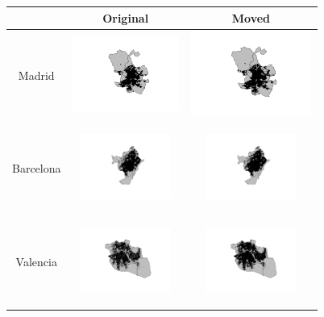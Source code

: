 \documentclass[times,final]{elsarticle}
\begin{document}
\begin{figure}
\centering
\begin{tabular}{|c|c|c|}
\hline
& Original & Moved
\\
\hline
Madrid &
\includegraphics[width=3.5cm, height=2.8cm]{figures/points-post-madrid}
&
\includegraphics[width=4cm, height=2.8cm]{figures/points-post-madrid}
\\
Barcelona &
\includegraphics[width=3cm, height=2.8cm]{figures/points-pre-barcelona}
&
\includegraphics[width=3cm, height=2.8cm]{figures/points-post-barcelona}
\\
Valencia &
\includegraphics[width=3cm, height=2.8cm]{figures/points-pre-valencia}
&
\includegraphics[width=3cm, height=2.8cm]{figures/points-post-valencia}
\\
\hline
\end{tabular}
\end{figure}
\end{document}

